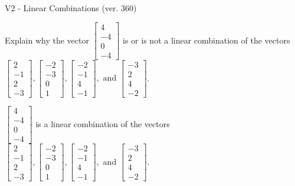 \begin{exercise}
  \begin{exerciseTitle}V2 - Linear Combinations (ver. 360)\end{exerciseTitle}
  \begin{exerciseStatement}
    Explain why the vector \(\left[\begin{array}{c}
4 \\
-4 \\
0 \\
-4
\end{array}\right]\)  is or is not a linear 
	combination of the vectors \(\left[\begin{array}{c}
2 \\
-1 \\
2 \\
-3
\end{array}\right] , \left[\begin{array}{c}
-2 \\
-3 \\
0 \\
1
\end{array}\right] , \left[\begin{array}{c}
-2 \\
-1 \\
4 \\
-1
\end{array}\right] , \text{ and } \left[\begin{array}{c}
-3 \\
2 \\
4 \\
-2
\end{array}\right]\).
	


  \end{exerciseStatement}
  \begin{exerciseAnswer}
   \(\left[\begin{array}{c}
4 \\
-4 \\
0 \\
-4
\end{array}\right]\) 
  	 is  
	a linear combination of the vectors \(\left[\begin{array}{c}
2 \\
-1 \\
2 \\
-3
\end{array}\right] , \left[\begin{array}{c}
-2 \\
-3 \\
0 \\
1
\end{array}\right] , \left[\begin{array}{c}
-2 \\
-1 \\
4 \\
-1
\end{array}\right] , \text{ and } \left[\begin{array}{c}
-3 \\
2 \\
4 \\
-2
\end{array}\right]\).


\end{exerciseAnswer}
\end{exercise}
